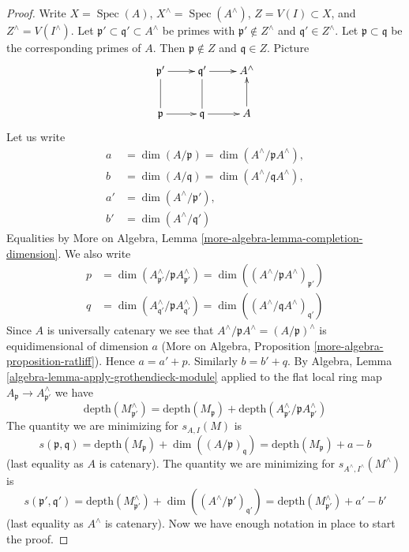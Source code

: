 \documentclass[10pt,a4paper]{amsart}
\theoremstyle{plain}
\theoremstyle{definition}
\theoremstyle{remark}
\numberwithin{equation}{subsection}
\def\Spec{\mathop{\mathrm{Spec}}}
\begin{document}
\begin{proof}
Write $X = \Spec(A)$, $X^\wedge = \Spec(A^\wedge)$, $Z = V(I) \subset X$, and
$Z^\wedge = V(I^\wedge)$.
Let $\mathfrak p' \subset \mathfrak q' \subset A^\wedge$
be primes with $\mathfrak p' \not \in Z^\wedge$ and
$\mathfrak q' \in Z^\wedge$. Let $\mathfrak p \subset \mathfrak q$
be the corresponding primes of $A$. Then $\mathfrak p \not \in Z$
and $\mathfrak q \in Z$. Picture
$$
\xymatrix{
\mathfrak p' \ar[r] & \mathfrak q' \ar[r] & A^\wedge \\
\mathfrak p \ar[r] \ar@{-}[u] &
\mathfrak q \ar[r] \ar@{-}[u] & A \ar[u]
}
$$
Let us write
\begin{align*}
a & = \dim(A/\mathfrak p) = \dim(A^\wedge/\mathfrak pA^\wedge),\\
b & = \dim(A/\mathfrak q) = \dim(A^\wedge/\mathfrak qA^\wedge),\\
a' & = \dim(A^\wedge/\mathfrak p'),\\
b' & = \dim(A^\wedge/\mathfrak q')
\end{align*}
Equalities by
More on Algebra, Lemma \ref{more-algebra-lemma-completion-dimension}.
We also write
\begin{align*}
p & = \dim(A^\wedge_{\mathfrak p'}/\mathfrak p A^\wedge_{\mathfrak p'}) =
\dim((A^\wedge/\mathfrak p A^\wedge)_{\mathfrak p'}) \\
q & = \dim(A^\wedge_{\mathfrak q'}/\mathfrak p A^\wedge_{\mathfrak q'}) =
\dim((A^\wedge/\mathfrak q A^\wedge)_{\mathfrak q'})
\end{align*}
Since $A$ is universally catenary we see that
$A^\wedge/\mathfrak pA^\wedge = (A/\mathfrak p)^\wedge$
is equidimensional of dimension $a$
(More on Algebra, Proposition \ref{more-algebra-proposition-ratliff}).
Hence $a = a' + p$. Similarly $b = b' + q$.
By Algebra, Lemma \ref{algebra-lemma-apply-grothendieck-module}
applied to the flat local ring map
$A_\mathfrak p \to A^\wedge_{\mathfrak p'}$
we have
$$
\text{depth}(M^\wedge_{\mathfrak p'})
=
\text{depth}(M_\mathfrak p) +
\text{depth}(A^\wedge_{\mathfrak p'} / \mathfrak p A^\wedge_{\mathfrak p'})
$$
The quantity we are minimizing for $s_{A, I}(M)$ is
$$
s(\mathfrak p, \mathfrak q) =
\text{depth}(M_\mathfrak p) + \dim((A/\mathfrak p)_\mathfrak q) =
\text{depth}(M_\mathfrak p) + a - b
$$
(last equality as $A$ is catenary). The quantity we are minimizing
for $s_{A^\wedge, I^\wedge}(M^\wedge)$
is
$$
s(\mathfrak p', \mathfrak q') =
\text{depth}(M^\wedge_{\mathfrak p'}) +
\dim((A^\wedge/\mathfrak p')_{\mathfrak q'}) =
\text{depth}(M^\wedge_{\mathfrak p'}) + a' - b'
$$
(last equality as $A^\wedge$ is catenary).
Now we have enough notation in place to start the proof.


\end{proof}
\end{document}
